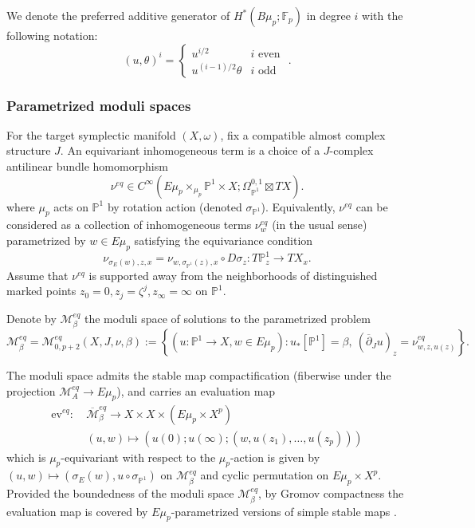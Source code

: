 \documentclass[reqno]{amsart}
\numberwithin{equation}{section}
\numberwithin{equation}{section}
\numberwithin{equation}{section}
\theoremstyle{definition}
\theoremstyle{remark}
\theoremstyle{remark}
\newcommand{\ov}{\overline}
\begin{document}
We denote the preferred additive generator of $H^*(B\mu_p;\mathbb{F}_p)$ in degree $i$ with the following notation:
\begin{equation}\label{eqn:eq-param}
    (u, \theta)^i = \begin{cases} u^{i/2} & i \mbox{ even } \\ u^{(i-1)/2}\theta & i \mbox{ odd } \end{cases}.
\end{equation}

\subsubsection{Parametrized moduli spaces}
For the target symplectic manifold $(X,\omega)$, fix a compatible almost complex structure $J$. An equivariant inhomogeneous term is a choice of a $J$-complex antilinear bundle homomorphism
\begin{equation}
    \nu^{eq} \in C^\infty ( E\mu_p  \times_{\mu_p} \mathbb{P}^1 \times X ; \Omega^{0,1}_{\mathbb{P}^1} \boxtimes TX).
\end{equation}
where $\mu_p$ acts on $\mathbb{P}^1$ by rotation action (denoted $\sigma_{\mathbb{P}^1}$). Equivalently, $\nu^{eq}$ can be considered as a collection of inhomogeneous terms $\nu^{eq}_w$ (in the usual sense) parametrized by $w \in E\mu_p$ satisfying the equivariance condition
\begin{equation}
    \nu_{ \sigma_{E} (  w), z, x} = \nu_{w, \sigma_{\mathbb{P}^1}(z), x} \circ D \sigma_z : T\mathbb{P}^1_z \to TX_x.
\end{equation}
Assume that $\nu^{eq}$ is supported away from the neighborhoods of distinguished marked points $z_0 = 0, z_j = \zeta^j, z_\infty = \infty$ on $\mathbb{P}^1$.

Denote by $\mathcal{M}^{eq}_\beta$ the moduli space of solutions to the parametrized problem
\begin{equation}
    \mathcal{M}^{eq}_\beta = \mathcal{M}_{0, p+2}^{eq}(X,J,\nu, \beta) := \left\{ (u:\mathbb{P}^1 \to X , w \in E\mu_p )  :  u_*[\mathbb{P}^1] =\beta, \ (\overline{\partial}_J u)_z = \nu^{eq}_{w, z, u(z)} \right\}.
\end{equation}

The moduli space admits the stable map compactification (fiberwise under the projection $\mathcal{M}^{eq}_A \to E\mu_p$), and carries an evaluation map
\begin{align}
    \mathrm{ev}^{eq}: \  &\ov{\mathcal{M}}^{eq}_\beta \to X \times X \times (E\mu_p \times X^p)  \\
    &(u,w) \mapsto (u(0) ; u(\infty);  (w, u(z_1), \dots, u(z_p)) )
\end{align}
which is $\mu_p$-equivariant with respect to the $\mu_p$-action is given by $(u,w) \mapsto (\sigma_E(w), u \circ \sigma_{\mathbb{P}^1})$ on $\mathcal{M}_\beta^{eq}$ and cyclic permutation on $E\mu_p \times X^p$. Provided the boundedness of the moduli space $\mathcal{M}^{eq}_\beta$, by Gromov compactness the evaluation map is covered by $E\mu_p$-parametrized versions of simple stable maps \cite[Chapter 6]{MS12}.
\end{document}
